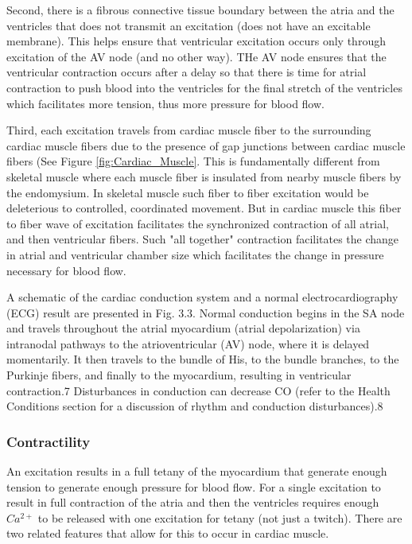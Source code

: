 Second, there is a fibrous connective tissue boundary between the atria and the ventricles that does not transmit an excitation (does not have an excitable membrane). This helps ensure that ventricular excitation occurs only through excitation of the AV node (and no other way). THe AV node ensures that the ventricular contraction occurs after a delay so that there is time for atrial contraction to push blood into the ventricles for the final stretch of the ventricles which facilitates more tension, thus more pressure for blood flow.

Third, each excitation travels from cardiac muscle fiber to the surrounding cardiac muscle fibers due to the presence of gap junctions between cardiac muscle fibers (See Figure \ref{fig:Cardiac_Muscle}. This is fundamentally different from skeletal muscle where each muscle fiber is insulated from nearby muscle fibers by the endomysium. In skeletal muscle such fiber to fiber excitation would be deleterious to controlled, coordinated movement. But in cardiac muscle this fiber to fiber wave of excitation facilitates the synchronized contraction of all atrial, and then ventricular fibers. Such "all together" contraction facilitates the change in atrial and ventricular chamber size which facilitates the change in pressure necessary for blood flow.


A schematic of the cardiac conduction system and a normal electrocardiography (ECG) result are presented in Fig. 3.3. Normal conduction begins in the SA node and travels throughout the atrial myocardium (atrial depolarization) via intranodal pathways to the atrioventricular (AV) node, where it is delayed momentarily. It then travels to the bundle of His, to the bundle branches, to the Purkinje fibers, and finally to the myocardium, resulting in ventricular contraction.7 Disturbances in conduction can decrease CO (refer to the Health Conditions section for a discussion of rhythm and conduction disturbances).8

\subsubsection{Contractility}

An excitation results in a full tetany of the myocardium that generate enough tension to generate enough pressure for blood flow. For a single excitation to result in full contraction of the atria and then the ventricles requires enough $Ca^{2+}$ to be released with one excitation for tetany (not just a twitch). There are two related features that allow for this to occur in cardiac muscle. 

